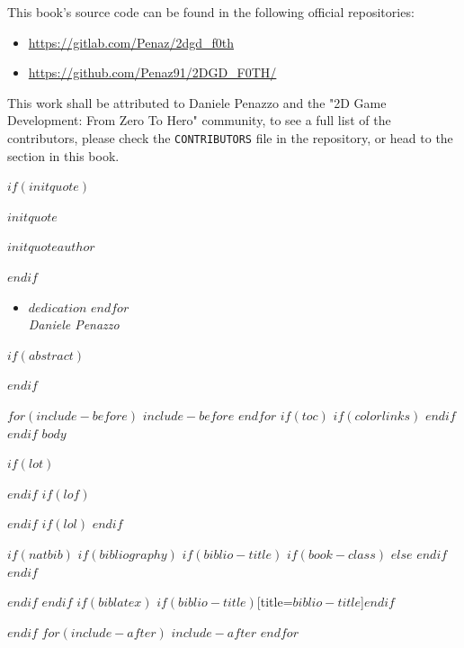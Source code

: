 \documentclass{article}
\begin{document}
This book's source code can be found in the following official repositories:

\begin{itemize}
    \item \url{https://gitlab.com/Penaz/2dgd_f0th}
    \item \url{https://github.com/Penaz91/2DGD_F0TH/}
\end{itemize}

\vspace{24pt}

This work shall be attributed to Daniele Penazzo and the "2D Game Development: From Zero To Hero" community, to see a full list of the contributors, please check the \texttt{CONTRIBUTORS} file in the repository, or head to the  section in this book.

\clearpage

\clearpage
\null
\vfill
\begin{minipage}[b]{\textwidth}
$if(initquote)$
\epigraph{$initquote$}{\textit{$initquoteauthor$}}
$endif$
\begin{itemize}[label={}]
    $for(dedication)$
        \item $dedication$
    $endfor$\\
    \textit{Daniele Penazzo}
\end{itemize}
\end{minipage}
\vfill
\cleardoublepage
\pagestyle{fancy}
\normalsize
$if(abstract)$
\begin{abstract}
$abstract$
\end{abstract}
$endif$

$for(include-before)$
$include-before$
$endfor$
$if(toc)$
{
$if(colorlinks)$
\hypersetup{linkcolor=$if(toccolor)$$toccolor$$else$black$endif$}
$endif$
\setcounter{tocdepth}{$toc-depth$}
\clearpage
\pagestyle{empty}
\null\clearpage
\pagestyle{fancy}
\tableofcontents
\clearpage
}
$endif$
\clearpage
{}
$body$

\clearpage
{}
$if(lot)$
\listoftables
$endif$
$if(lof)$
\listoffigures
$endif$
$if(lol)$
\lstlistoflistings
$endif$

$if(natbib)$
$if(bibliography)$
$if(biblio-title)$
$if(book-class)$
\renewcommand\bibname{$biblio-title$}
$else$
\renewcommand\refname{$biblio-title$}
$endif$
$endif$


$endif$
$endif$
$if(biblatex)$
\printbibliography$if(biblio-title)$[title=$biblio-title$]$endif$

$endif$
$for(include-after)$
$include-after$
\pagebreak
$endfor$
\end{document}
